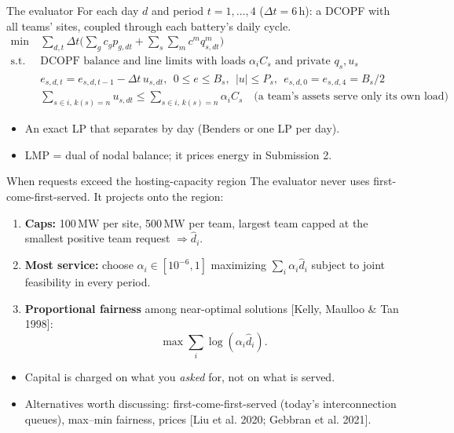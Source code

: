 \documentclass[aspectratio=169,11pt]{beamer}
\newcommand{\MW}{\ensuremath{\,\mathrm{MW}}}
\newcommand{\src}[1]{{\scriptsize\color{PurdueSteel}[#1]}}
\begin{document}
\begin{frame}{The evaluator}
  \small
  For each day $d$ and period $t = 1,\dots,4$ ($\Delta t = 6$\,h): a DCOPF with
  all teams' sites, coupled through each battery's daily cycle.
  \begin{align*}
    \min\ & \textstyle\sum_{d,t} \Delta t \big(\sum_g c_g p_{g,dt} + \sum_s \sum_m c^m q^m_{s,dt}\big)\\
    \text{s.t.}\ & \text{DCOPF balance and line limits with loads } \alpha_i C_s
      \text{ and private } q_s, u_s\\
    & e_{s,d,t} = e_{s,d,t-1} - \Delta t\, u_{s,dt},\ \ 0\le e\le B_s,\ \ |u|\le P_s,\ \
      e_{s,d,0} = e_{s,d,4} = B_s/2\\
    & \textstyle\sum_{s\in i,\,k(s)=n} u_{s,dt} \le \sum_{s\in i,\,k(s)=n} \alpha_i C_s
      \quad\text{(a team's assets serve only its own load)}
  \end{align*}
  \begin{itemize}
    \item An exact LP that separates by day (Benders or one LP per day).
    \item LMP = dual of nodal balance; it prices energy in Submission 2.
  \end{itemize}
\end{frame}

\begin{frame}{When requests exceed the hosting-capacity region}
  \small
  The evaluator never uses first-come-first-served. It projects onto
  the region:
  \begin{enumerate}
    \item \textbf{Caps:} 100\MW{} per site, 500\MW{} per team, largest team
      capped at the smallest positive team request $\Rightarrow \hat d_i$.
    \item \textbf{Most service:} choose $\alpha_i\in[10^{-6},1]$ maximizing
      $\sum_i \alpha_i \hat d_i$ subject to joint feasibility in every period.
    \item \textbf{Proportional fairness} among near-optimal solutions
      \src{Kelly, Maulloo \& Tan 1998}:
      \[\textstyle \max \sum_i \log(\alpha_i \hat d_i).\]
  \end{enumerate}
  \begin{itemize}
    \item Capital is charged on what you \emph{asked} for, not on what is served.
    \item Alternatives worth discussing: first-come-first-served (today's
      interconnection queues), max--min fairness, prices
      \src{Liu et al. 2020; Gebbran et al. 2021}.
  \end{itemize}
\end{frame}
\end{document}
